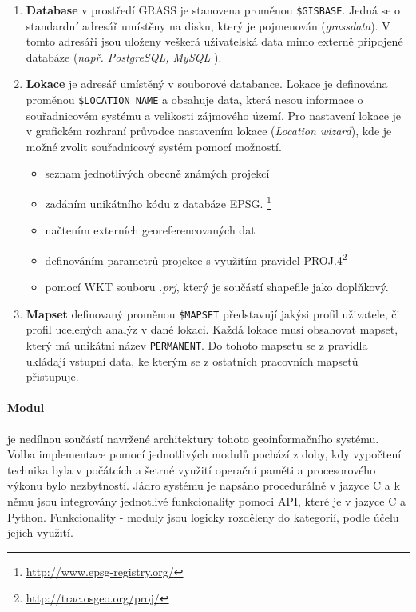 \documentclass[a4paper,12pt,oneside]{report}
\begin{document}
\begin{enumerate}
\item \textbf{Database} v prostředí GRASS je stanovena proměnou \texttt{\$GISBASE}. Jedná se o standardní adresář umístěny na disku, který je pojmenován (\textit{grassdata}). V tomto adresáři jsou uloženy veškerá uživatelská data mimo externě připojené databáze (\textit{např. PostgreSQL, MySQL }).

\item \textbf{Lokace} je adresář umístěný v souborové databance. Lokace je definována proměnou   \texttt{\$LOCATION\_NAME}
a obsahuje data, která nesou informace o souřadnicovém systému a velikosti zájmového území. Pro nastavení lokace je v grafickém rozhraní průvodce nastavením lokace (\textit{Location wizard}), kde je možné zvolit souřadnicový systém pomocí možností.
\begin{itemize}
\item seznam jednotlivých obecně známých projekcí 
\item zadáním unikátního kódu z databáze \acs{EPSG}. \footnote{\url{http://www.epsg-registry.org/}}
\item načtením externích georeferencovaných dat
\item definováním parametrů projekce s využitím pravidel PROJ.4\footnote{\url{http://trac.osgeo.org/proj/}}
\item pomocí \ac{WKT} souboru \emph{.prj}, který je součástí shapefile jako doplňkový.
\end{itemize}

\item \textbf{Mapset} definovaný proměnou \texttt{\$MAPSET} představují jakýsi profil uživatele, či profil ucelených analýz  v dané lokaci. Každá lokace musí obsahovat mapset, který má unikátní název \texttt{PERMANENT}. Do tohoto mapsetu se z pravidla ukládají vstupní data, ke kterým se z ostatních pracovních mapsetů přistupuje.
\end{enumerate}



\paragraph*{Modul} je nedílnou součástí navržené architektury tohoto geoinformačního systému. Volba implementace pomocí jednotlivých modulů pochází z doby, kdy vypočtení technika byla v počátcích a šetrné využití operační paměti a procesorového výkonu bylo nezbytností. Jádro systému je napsáno procedurálně v jazyce C a k němu jsou  integrovány jednotlivé funkcionality  pomoci \acs{API}, které je v jazyce C a Python. Funkcionality - moduly jsou logicky rozděleny do kategorií, podle účelu jejich využití.
\end{document}
